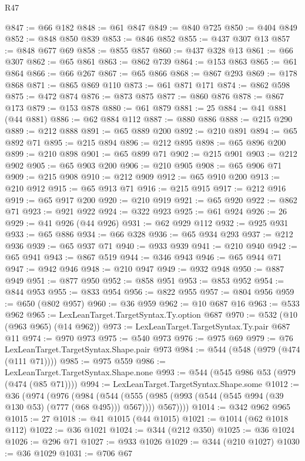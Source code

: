 \begin{lexlean}{R47}
\begin{coremodule}
@847 := @66 @182
@848 := @61 @847
@849 := @840 @725
@850 := @404 @849
@852 := @848 @850 @839
@853 := @846 @852
@855 := @437 @307 @13
@857 := @848 @677 @69
@858 := @855 @857
@860 := @437 @328 @13
@861 := @66 @307
@862 := @65 @861
@863 := @862 @739
@864 := @153 @863
@865 := @61 @864
@866 := @66 @267
@867 := @65 @866
@868 := @867 @293
@869 := @178 @868
@871 := @865 @869 @110
@873 := @61 @871 @171
@874 := @862 @598
@875 := @472 @874
@876 := @873 @875
@877 := @860 @876
@878 := @867 @173
@879 := @153 @878
@880 := @61 @879
@881 := 25
@884 := @41 @881 (@44 @881)
@886 := @62 @884 @112
@887 := @880 @886
@888 := @215 @290
@889 := @212 @888
@891 := @65 @889 @200
@892 := @210 @891
@894 := @65 @892 @71
@895 := @215 @894
@896 := @212 @895
@898 := @65 @896 @200
@899 := @210 @898
@901 := @65 @899 @71
@902 := @215 @901
@903 := @212 @902
@905 := @65 @903 @200
@906 := @210 @905
@908 := @65 @906 @71
@909 := @215 @908
@910 := @212 @909
@912 := @65 @910 @200
@913 := @210 @912
@915 := @65 @913 @71
@916 := @215 @915
@917 := @212 @916
@919 := @65 @917 @200
@920 := @210 @919
@921 := @65 @920
@922 := @862 @71
@923 := @921 @922
@924 := @322 @923
@925 := @61 @924
@926 := 26
@929 := @41 @926 (@44 @926)
@931 := @62 @929 @112
@932 := @925 @931
@933 := @65 @886
@934 := @66 @328
@936 := @65 @934 @293
@937 := @212 @936
@939 := @65 @937 @71
@940 := @933 @939
@941 := @210 @940
@942 := @65 @941
@943 := @867 @519
@944 := @346 @943
@946 := @65 @944 @71
@947 := @942 @946
@948 := @210 @947
@949 := @932 @948
@950 := @887 @949
@951 := @877 @950
@952 := @858 @951
@953 := @853 @952
@954 := @844 @953
@955 := @833 @954
@956 := @822 @955
@957 := @804 @956
@959 := @650 (@802 @957)
@960 := @36 @959
@962 := @10 @687 @16
@963 := @533 @962
@965 := LexLeanTarget.TargetSyntax.Ty.option @687
@970 := @532 (@10 (@963 @965) (@14 @962))
@973 := LexLeanTarget.TargetSyntax.Ty.pair @687 @11
@974 := @970 @973
@975 := @540 @973
@976 := @975 @69
@979 := @76 LexLeanTarget.TargetSyntax.Shape.pair @973
@984 := @544 (@548 (@979 (@474 (@111 @71))))
@985 := @975 @559
@986 := LexLeanTarget.TargetSyntax.Shape.none
@993 := @544 (@545 @986 @53 (@979 (@474 (@85 @71))))
@994 := LexLeanTarget.TargetSyntax.Shape.some
@1012 := @36
    (@974
      (@976
        (@984
          (@544
            (@555 (@985 (@993 (@544 (@545 @994 (@39 @130 @53) (@777 (@68 @495))) @567))))
            @567))))
@1014 := @342 @962 @965
@1015 := 27
@1018 := @41 @1015 (@44 @1015)
@1021 := @1014 (@62 @1018 @112)
@1022 := @36 @1021
@1024 := @344 (@212 @350)
@1025 := @36 @1024
@1026 := @296 @71
@1027 := @933 @1026
@1029 := @344 (@210 @1027)
@1030 := @36 @1029
@1031 := @706 @67

\end{coremodule}
\end{lexlean}
